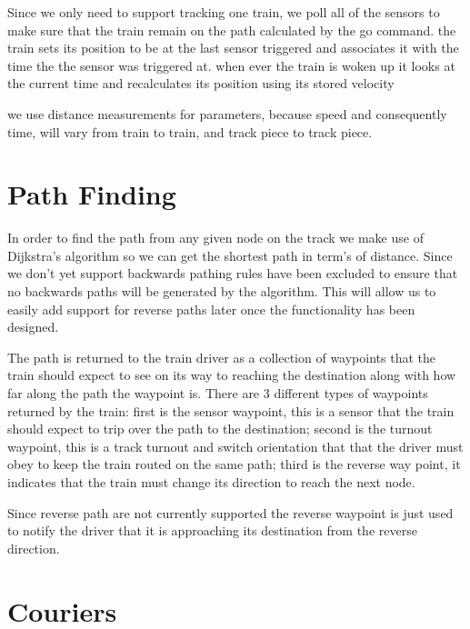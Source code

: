 \documentclass[pdftex,10pt,a4paper]{article}
\begin{document}
Since we only need to support tracking one train, we poll all of the sensors to
make sure that the train remain on the path calculated by the go command. the train
sets its position to be at the last sensor triggered and associates it with the time
the the sensor was triggered at. when ever the train is woken up it looks at the 
current time and recalculates its position using its stored velocity

we use distance measurements for parameters, because speed and
consequently time, will vary from train to train, and track piece to
track piece.

\section*{Path Finding}

In order to find the path from any given node on the track we make use of
Dijkstra's algorithm so we can get the shortest path in term's of distance.
Since we don't yet support backwards pathing rules have been excluded to
ensure that no backwards paths will be generated by the algorithm. This will
allow us to easily add support for reverse paths later once the functionality
has been designed.

The path is returned to the train driver as a collection of waypoints that the
train should expect to see on its way to reaching the destination along with
how far along the path the waypoint is. There are 3 different types of
waypoints returned by the train: first is the sensor waypoint, this is a sensor
that the train should expect to trip over the path to the destination; second
is the turnout waypoint, this is a track turnout and switch orientation that
that the driver must obey to keep the train routed on the same path; third is
the reverse way point, it indicates that the train must change its direction to
reach the next node.

Since reverse path are not currently supported the reverse waypoint is just used
to notify the driver that it is approaching its destination from the reverse
direction.

\section*{Couriers}
\end{document}
